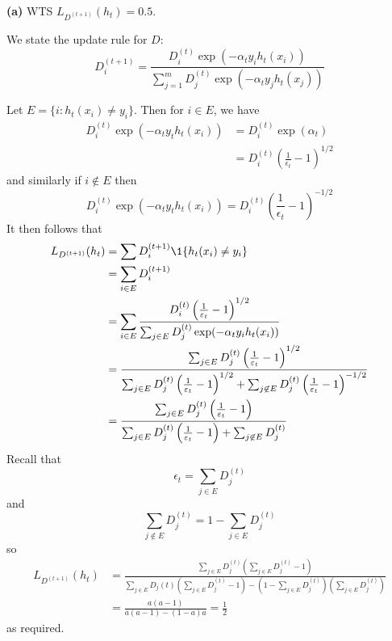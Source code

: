 \documentclass[a4paper, 10pt]{article}
\begin{document}
\begin{problem}
    \textbf{(a)} WTS $L_{D^{(t+1)}}(h_t) = 0.5$.

    We state the update rule for $D$:\begin{equation*}
    D_i^{(t+1)} = \frac{D_i^{(t)} \exp(-\alpha_t y_i h_t(x_i))}{\sum_{j=1}^{m} D_j^{(t)}\exp(-\alpha_t y_j h_t(x_j))}
    \end{equation*}

    Let $E = \{i : h_t(x_i) \neq y_i\}$. Then for $i \in E$, we have
    \begin{align*}
        D_i^{(t)} \exp(-\alpha_t y_t h_t(x_i)) &= D_i^{(t)} \exp(\alpha_t) \\
        &= D_i^{(t)} \left(\frac{1}{\epsilon_t} - 1\right)^{1/2}
    \end{align*}
    and similarly if $i \not \in E$ then \begin{equation*}
        D_i^{(t)}  \exp(-\alpha_t y_t h_t(x_i)) = D_i^{(t)} \left(\frac{1}{\epsilon_t} - 1\right)^{-1/2}
    \end{equation*}
    It then follows that
    \begin{align*}
    L_{D^{(t+1)}}(h_t) &= \sum D_{i}^{(t+1)} \1 \{h_t(x_i) \neq y_i\} \\
    &= \sum_{i \in E} D_{i}^{(t+1)} \\
    &= \sum_{i \in E} \frac{D_i^{(t)} \left(\frac{1}{\epsilon_t} - 1\right)^{1/2}}{\sum_{j \in E} D_j^{(t)} \exp(-\alpha_t y_i h_t(x_i))} \\
    &= \frac{\sum_{j \in E} D_j^{(t)} \left(\frac{1}{\epsilon_t} - 1\right)^{1/2}}{\sum_{j \in E} D_j^{(t)} \left(\frac{1}{\epsilon_t} - 1\right)^{1/2} + \sum_{j \not \in E} D_j^{(t)} \left(\frac{1}{\epsilon_t} - 1\right)^{-1/2}}  \\
    &= \frac{\sum_{j \in E} D_j^{(t)} \left(\frac{1}{\epsilon_t} - 1\right)}{\sum_{j \in E} D_j^{(t)} \left(\frac{1}{\epsilon_t} - 1\right) + \sum_{j \not \in E} D_j^{(t)}}  \\
    \end{align*}
    Recall that \begin{equation*}
    \epsilon_t = \sum_{j \in E} D_j^{(t)}
    \end{equation*}
    and \begin{equation*}
    \sum_{j \not \in E} D_j^{(t)} = 1 - \sum_{j \in E} D_j^{(t)}
    \end{equation*}
    so \begin{align*}
        L_{D^{(t+1)}}(h_t) &= \frac{\sum_{j \in E} D_j^{(t)} (\sum_{j \in E} D_j^{(t)} - 1)}{\sum_{j \in E}D_j(t)(\sum_{j \in E} D_j^{(t)} - 1) - (1 - \sum_{j \in E} D_j^{(t)})(\sum_{j \in E} D_j^{(t)})} \\
        &= \frac{a(a-1)}{a(a-1) - (1-a)a} = \frac{1}{2}
    \end{align*}
    as required.


\end{problem}
\end{document}
